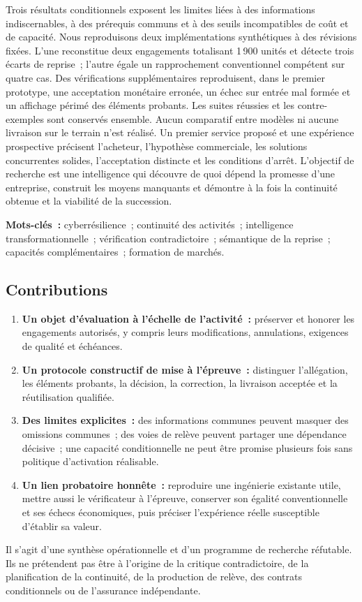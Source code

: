 \documentclass[11pt,a4paper]{article}
\begin{document}
Trois résultats conditionnels exposent les limites liées à des informations indiscernables, à des prérequis communs et à des seuils incompatibles de coût et de capacité. Nous reproduisons deux implémentations synthétiques à des révisions fixées. L’une reconstitue deux engagements totalisant 1\,900 unités et détecte trois écarts de reprise~; l’autre égale un rapprochement conventionnel compétent sur quatre cas. Des vérifications supplémentaires reproduisent, dans le premier prototype, une acceptation monétaire erronée, un échec sur entrée mal formée et un affichage périmé des éléments probants. Les suites réussies et les contre-exemples sont conservés ensemble. Aucun comparatif entre modèles ni aucune livraison sur le terrain n’est réalisé. Un premier service proposé et une expérience prospective précisent l’acheteur, l’hypothèse commerciale, les solutions concurrentes solides, l’acceptation distincte et les conditions d’arrêt. L’objectif de recherche est une intelligence qui découvre de quoi dépend la promesse d’une entreprise, construit les moyens manquants et démontre à la fois la continuité obtenue et la viabilité de la succession.

\textbf{Mots-clés~:} cyberrésilience~; continuité des activités~; intelligence transformationnelle~; vérification contradictoire~; sémantique de la reprise~; capacités complémentaires~; formation de marchés.

\subsection*{Contributions}
\begin{enumerate}
\item \textbf{Un objet d’évaluation à l’échelle de l’activité~:} préserver et honorer les engagements autorisés, y compris leurs modifications, annulations, exigences de qualité et échéances.
\item \textbf{Un protocole constructif de mise à l’épreuve~:} distinguer l’allégation, les éléments probants, la décision, la correction, la livraison acceptée et la réutilisation qualifiée.
\item \textbf{Des limites explicites~:} des informations communes peuvent masquer des omissions communes~; des voies de relève peuvent partager une dépendance décisive~; une capacité conditionnelle ne peut être promise plusieurs fois sans politique d’activation réalisable.
\item \textbf{Un lien probatoire honnête~:} reproduire une ingénierie existante utile, mettre aussi le vérificateur à l’épreuve, conserver son égalité conventionnelle et ses échecs économiques, puis préciser l’expérience réelle susceptible d’établir sa valeur.
\end{enumerate}
Il s’agit d’une synthèse opérationnelle et d’un programme de recherche réfutable. Ils ne prétendent pas être à l’origine de la critique contradictoire, de la planification de la continuité, de la production de relève, des contrats conditionnels ou de l’assurance indépendante.
\end{document}
